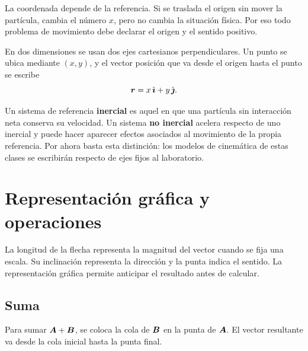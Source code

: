\documentclass[11pt]{article}
\begin{document}
La coordenada depende de la referencia. Si se traslada el origen sin mover la
partícula, cambia el número \(x\), pero no cambia la situación física. Por eso
todo problema de movimiento debe declarar el origen y el sentido positivo.

En dos dimensiones se usan dos ejes cartesianos perpendiculares. Un punto se
ubica mediante \((x,y)\), y el vector posición que va desde el origen hasta el
punto se escribe
\[
  \boldsymbol{r}=x\,\hat{\boldsymbol{\imath}}+y\,\hat{\boldsymbol{\jmath}}.
\]

\begin{center}
\end{center}

Un sistema de referencia \textbf{inercial} es aquel en que una partícula sin
interacción neta conserva su velocidad. Un sistema \textbf{no inercial}
acelera respecto de uno inercial y puede hacer aparecer efectos asociados al
movimiento de la propia referencia. Por ahora basta esta distinción: los
modelos de cinemática de estas clases se escribirán respecto de ejes fijos al
laboratorio.

\section{Representación gráfica y operaciones}

La longitud de la flecha representa la magnitud del vector cuando se fija una
escala. Su inclinación representa la dirección y la punta indica el sentido.
La representación gráfica permite anticipar el resultado antes de calcular.

\subsection{Suma}

Para sumar \(\boldsymbol{A}+\boldsymbol{B}\), se coloca la cola de \(\boldsymbol{B}\) en la
punta de \(\boldsymbol{A}\). El vector resultante va desde la cola inicial hasta la
punta final.
\end{document}
